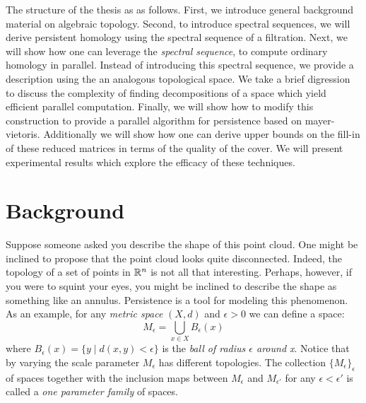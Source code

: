 The structure of the thesis as as follows. First, we introduce general background material on algebraic topology. Second, to introduce spectral sequences, we will derive persistent homology using the spectral sequence of a filtration. Next, we will show how one can leverage the \emph{\mv spectral sequence}, to compute ordinary homology in parallel. Instead of introducing this spectral sequence, we provide a description using the \mvb{} an analogous topological space. We take a brief digression to discuss the complexity of finding decompositions of a space which yield efficient parallel computation. Finally, we will show how to modify this construction to provide a parallel algorithm for persistence based on mayer-vietoris. Additionally we will show how one can derive upper bounds on the fill-in of these reduced matrices in terms of the quality of the cover. We will present experimental results which explore the efficacy of these techniques.

\section{Background}
Suppose someone asked you describe the shape of this point cloud. One might be inclined to propose that the point cloud looks quite disconnected. Indeed, the topology of a set of points in $\mathbb{R}^n$ is not all that interesting. Perhaps, however, if you were to squint your eyes, you might be inclined to describe the shape as something like an annulus. Persistence is a tool for modeling this phenomenon. As an example, for any \emph{metric space} $(X,d)$ and  $\epsilon > 0$ we can define a space: \[ M_\epsilon = \bigcup_{x \in X} B_{\epsilon}(x) \] where $B_{\epsilon}(x) = \{ y \mid d(x,y) < \epsilon\} $ is the \emph{ball of radius $\epsilon$ around x}. Notice that by varying the scale parameter $M_\epsilon$ has different topologies. The collection $\{M_\epsilon\}_\epsilon$ of spaces together with the inclusion maps between $M_\epsilon$ and $M_{\epsilon'}$ for any $\epsilon < \epsilon'$ is called a \emph{one parameter family} of spaces.   
 
